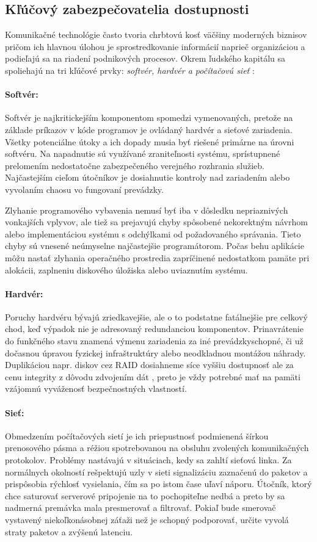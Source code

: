 \documentclass[12pt, a4paper]{article}
\begin{document}
\subsection{Kľúčový zabezpečovatelia dostupnosti}
Komunikačné technológie často tvoria chrbtovú kosť väčšiny moderných biznisov pričom ich hlavnou úlohou je 
sprostredkovanie informácií naprieč organizáciou a podieľajú sa na riadení podnikových procesov. Okrem 
ľudského kapitálu sa spoliehajú na tri kľúčové prvky: \emph{softvér, hardvér a počítačovú sieť} 
\cite{availability}:

\paragraph{Softvér:}
Softvér je najkritickejším komponentom spomedzi vymenovaných, pretože na základe príkazov v kóde programov 
je ovládaný hardvér a sieťové zariadenia. Všetky potenciálne útoky a ich dopady musia byť riešené primárne 
na úrovni softvéru. Na napadnutie sú využívané zraniteľnosti systému, sprístupnené prelomením nedostatočne 
zabezpečeného verejného rozhrania služieb. Najčastejším cieľom útočníkov je dosiahnutie kontroly nad 
zariadením alebo vyvolaním chaosu vo fungovaní prevádzky. 
 
Zlyhanie programového vybavenia nemusí byť iba v dôsledku nepriaznivých vonkajších vplyvov, ale tiež sa 
prejavujú chyby spôsobené nekorektným návrhom alebo implementáciou systému s odchýlkami od
požadovaného správania. Tieto chyby sú  vnesené neúmyselne najčastejšie programátorom. Počas behu aplikácie 
môžu nastať zlyhania operačného prostredia zapríčinené nedostatkom pamäte pri alokácii, zaplneniu diskového 
úložiska alebo uviaznutím systému. 

\paragraph{Hardvér:}
Poruchy hardvéru bývajú zriedkavejšie, ale o to podstatne fatálnejšie pre celkový chod, keď
výpadok nie je adresovaný redundanciou komponentov. Prinavrátenie do funkčného stavu znamená výmenu
zariadenia za iné prevádzkyschopné, či už dočasnou úpravou fyzickej infraštruktúry alebo neodkladnou 
montážou náhrady. Duplikáciou napr. diskov cez RAID dosiahneme síce vyššiu dostupnosť ale za cenu integrity 
z dôvodu zdvojením dát \cite{availability}, preto je vždy potrebné mať na pamäti vzájomnú vyváženosť 
bezpečnostných vlastností.

\paragraph{Sieť:}
Obmedzením počítačových sietí je ich priepustnosť podmienená šírkou prenosového pásma a réžiou 
spotrebovanou na obsluhu zvolených komunikačných protokolov. Problémy nastávajú v situáciach, kedy sa 
zahltí sieťová linka. Za normálnych okolností rešpektujú uzly v sieti signalizáciu zaznačenú do 
paketov a prispôsobia rýchlosť vysielania, čím sa po istom čase uľaví náporu. Útočník, ktorý chce saturovať 
serverové pripojenie na to pochopiteľne nedbá a preto by sa nadmerná premávka mala presmerovať a 
filtrovať. Pokiaľ bude smerovač vystavený niekoľkonásobnej záťaži než je schopný podporovať, určite vyvolá 
straty paketov a zvýšenú latenciu.
\end{document}
